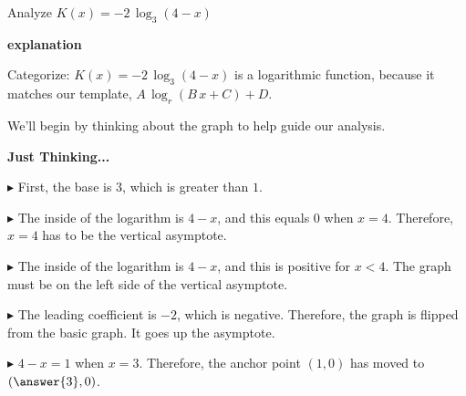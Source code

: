 \documentclass{ximera}
\begin{document}
\begin{formuala}
\begin{image}
\end{image}

































\begin{example}  


Analyze   $K(x) = -2 \, \log_3(4-x)$ 


\textbf{\textcolor{red!75!green}{explanation}} 


Categorize: $K(x) = -2 \, \log_3(4-x)$ is a logarithmic function, because it matches our template, $A \, \log_r(B \, x + C) + D$. 


We'll begin by thinking about the graph to help guide our analysis. 





\textbf{Just Thinking...}  


$\blacktriangleright$ First, the base is $3$, which is greater than $1$.

$\blacktriangleright$ The inside of the logarithm is $4-x$, and this equals $0$ when $x=4$.  Therefore, $x=4$ has to be the vertical asymptote.

$\blacktriangleright$ The inside of the logarithm is $4-x$, and this is positive for $x<4$.  The graph must be on the left side of the vertical asymptote.

$\blacktriangleright$ The leading coefficient is $-2$, which is negative.  Therefore, the graph is flipped  from the basic graph. It goes up the asymptote. 

$\blacktriangleright$ $4-x=1$ when $x=3$. Therefore, the anchor point $(1,0)$ has moved to $\left( \answer{3}, 0 \right)$.






\end{example}
\end{formuala}
\end{document}
